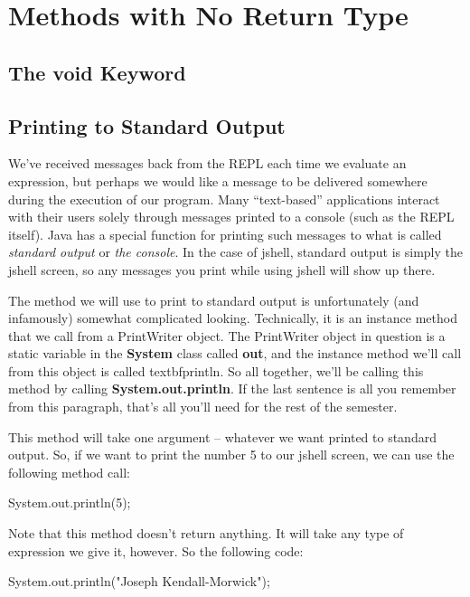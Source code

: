 \section{Methods with No Return Type}

\subsection{The void Keyword}

\subsection{Printing to Standard Output}

We've received messages back from the REPL each time we evaluate an expression, but perhaps we would like a message to be delivered somewhere during the execution of our program. Many ``text-based'' applications interact with their users solely through messages printed to a console (such as the REPL itself). Java has a special function for printing such messages to what is called \textit{standard output} or \textit{the console}. In the case of jshell, standard output is simply the jshell screen, so any messages you print while using jshell will show up there.

The method we will use to print to standard output is unfortunately (and infamously) somewhat complicated looking. Technically, it is an instance method that we call from a PrintWriter object. The PrintWriter object in question is a static variable in the \textbf{System} class called \textbf{out}, and the instance method we'll call from this object is called textbf{println}. So all together, we'll be calling this method by calling \textbf{System.out.println}. If the last sentence is all you remember from this paragraph, that's all you'll need for the rest of the semester. 

This method will take one argument -- whatever we want printed to standard output. So, if we want to print the number 5 to our jshell screen, we can use the following method call:

\begin{code}
System.out.println(5);
\end{code}

Note that this method doesn't return anything. It will take any type of expression we give it, however. So the following code:

\begin{code}
System.out.println("Joseph Kendall-Morwick");
\end{code}

